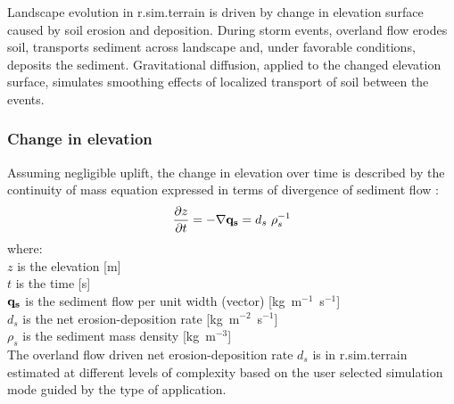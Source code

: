 \documentclass[gmd, manuscript]{copernicus}
\begin{document}
Landscape evolution in r.sim.terrain 
is driven by change in elevation surface caused by soil erosion and deposition.
During storm events, overland flow erodes soil, transports sediment across landscape and, 
under favorable conditions, deposits the sediment. Gravitational diffusion, applied to the changed elevation
surface, simulates smoothing effects of localized transport of soil between the events.

\subsubsection{Change in elevation} 

Assuming negligible uplift, the change in elevation over time 
is described by the continuity of mass equation expressed in terms of divergence 
of sediment flow  \citep{Tucker2001}:
\begin{equation}
\label{eq:evolution} 
{\partial z \over \partial t } = -\nabla {\bf q_s} = d_s ~ \rho_s^{-1} 
\end{equation}
{\small
where: \\
\noindent
\hspace*{0.5em} $z$ is the elevation [\unit{m}] \\
\hspace*{0.5em} $t$ is the time [\unit{s}] \\
\hspace*{0.5em} ${\bf q_s}$ is the sediment flow per unit width (vector) [\unit{kg~m}$^{-1}$~\unit{s}$^{-1}$]\\
\hspace*{0.5em} $d_s$ is the net erosion-deposition rate [\unit{kg~m}$^{-2}$~\unit{s}$^{-1}$]\\
\hspace*{0.5em} $\rho_s$ is the sediment mass density [\unit{kg~m}$^{-3}$]\\
}
The overland flow driven net erosion-deposition rate $d_s$ 
 is in r.sim.terrain estimated at different levels of complexity based 
on the user selected simulation mode guided by the type of application.
\end{document}
